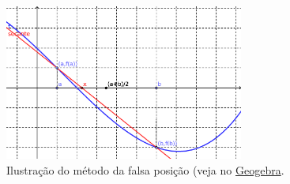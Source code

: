 \begin{figure}[h!]
  \centering
  \includegraphics[width=0.7\textwidth]{./cap_eq1d/dados/fig_falsapos/fig_falsapos}
  \caption{Ilustração do método da falsa posição (veja no \href{https://github.com/phkonzen/notas/blob/master/src/MatematicaNumerica/cap_eq1d/dados/fig_falsapos/fig_falsapos.ggb}{Geogebra}.}
  \label{fig:falsapos}
\end{figure}

\emconstrucao